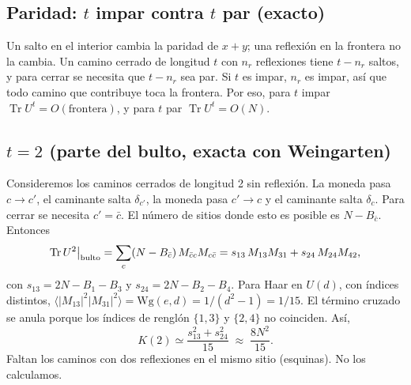 \documentclass[aps, pra, onecolumn, longbibliography]{revtex4-2}
\newcommand{\Tr}{\operatorname{Tr}}
\begin{document}
\subsection{Paridad: $t$ impar contra $t$ par (exacto)}
Un salto en el interior cambia la paridad de $x+y$; una reflexión en la
frontera no la cambia. Un camino cerrado de longitud $t$ con $n_r$ reflexiones
tiene $t-n_r$ saltos, y para cerrar se necesita que $t-n_r$ sea par. Si $t$ es
impar, $n_r$ es impar, así que todo camino que contribuye toca la frontera.
Por eso, para $t$ impar $\Tr U^t=O(\text{frontera})$, y para $t$ par
$\Tr U^t=O(N)$.

\subsection{$t=2$ (parte del bulto, exacta con Weingarten)}
Consideremos los caminos cerrados de longitud 2 sin reflexión. La moneda pasa
$c\to c'$, el caminante salta $\delta_{c'}$, la moneda pasa $c'\to c$ y el
caminante salta $\delta_c$. Para cerrar se necesita $c'=\bar c$. El número de
sitios donde esto es posible es $N-B_{\bar c}$. Entonces
\begin{equation}
    \Tr U^2\big|_{\rm bulto}
    =\sum_c (N-B_{\bar c})\,M_{\bar c c}M_{c\bar c}
    =s_{13}\,M_{13}M_{31}+s_{24}\,M_{24}M_{42},
\end{equation}
con $s_{13}=2N-B_1-B_3$ y $s_{24}=2N-B_2-B_4$. Para Haar en $U(d)$, con índices
distintos,
$\langle|M_{13}|^2|M_{31}|^2\rangle=\mathrm{Wg}(e,d)=1/(d^2-1)=1/15$. El
término cruzado se anula porque los índices de renglón $\{1,3\}$ y $\{2,4\}$ no
coinciden. Así,
\begin{equation}
    \boxed{K(2)\simeq\frac{s_{13}^2+s_{24}^2}{15}\;\approx\;\frac{8N^2}{15}.}
    \label{eq:K2}
\end{equation}
Faltan los caminos con dos reflexiones en el mismo sitio (esquinas). No los
calculamos.
\end{document}
